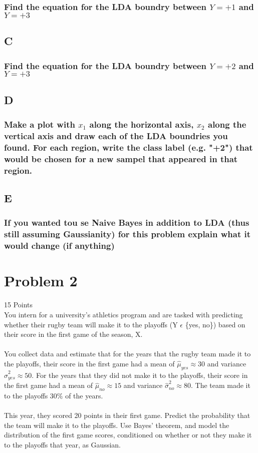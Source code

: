 \documentclass[12pt]{article}
\begin{document}
\subsubsection{Find the equation for the LDA boundry between $Y = +1$ and $Y = +3$}

\subsection{C}
\subsubsection{Find the equation for the LDA boundry between $Y = +2$ and $Y = +3$}

\subsection{D}
\subsubsection{Make a plot with $x_1$ along the horizontal axis, $x_2$ along the vertical axis and draw each of the LDA boundries you found. For each region, write the class label (e.g. "+2") that would be chosen for a new sampel that appeared in that region.}

\subsection{E}
\subsubsection{If you wanted tou se Naive Bayes in addition to LDA (thus still assuming Gaussianity) for this problem explain what it would change (if anything)}


\pagebreak
\section{Problem 2}
15 Points\\
You intern for a university's athletics program and are tasked with predicting whether their rugby team will make it to the playoffs (Y $\epsilon$ \{yes, no\}) based on their  score in the first game of the season, X.\\\\
You collect data and estimate that for the years that the rugby team made it to the playoffs, their score in the first game had a mean of $\hat{\mu}_{yes} \approx 30$ and variance $\hat{\sigma}^2_{yes} \approx 50$. For the years that they did not make it to the playoffs, their score in the first game had a mean of $\hat{\mu}_{no} \approx 15$ and variance $\hat{\sigma}^2_{no} \approx 80$. The team made it to the playoffs $30\%$ of the years.\\\\
This year, they scored 20 points in their first game. Predict the probability that the team will make it to the playoffs. Use Bayes' theorem, and model the distribution of the first game scores, conditioned on whether or not they make it to the playoffs that year, as Gaussian.



\end{document}
